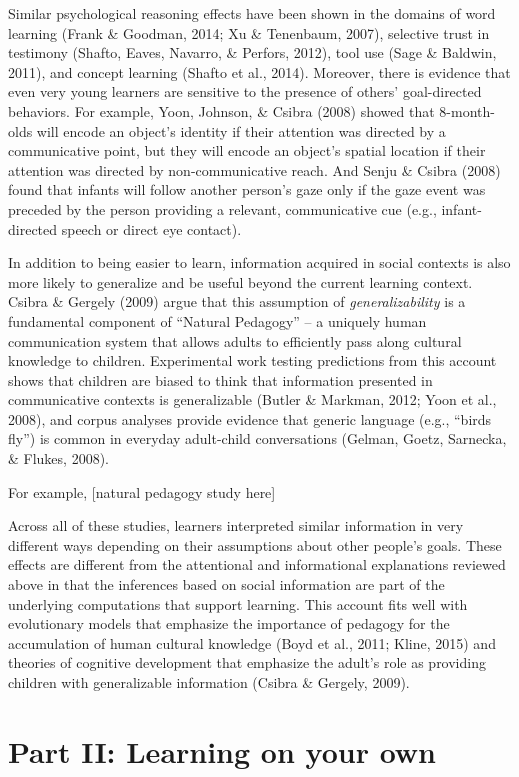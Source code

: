 \documentclass[a4paper,man,apacite,floatsintext]{apa6}
\begin{document}
Similar psychological reasoning effects have been shown in the domains
of word learning (Frank \& Goodman, 2014; Xu \& Tenenbaum, 2007),
selective trust in testimony (Shafto, Eaves, Navarro, \& Perfors, 2012),
tool use (Sage \& Baldwin, 2011), and concept learning (Shafto et al.,
2014). Moreover, there is evidence that even very young learners are
sensitive to the presence of others' goal-directed behaviors. For
example, Yoon, Johnson, \& Csibra (2008) showed that 8-month-olds will
encode an object's identity if their attention was directed by a
communicative point, but they will encode an object's spatial location
if their attention was directed by non-communicative reach. And Senju \&
Csibra (2008) found that infants will follow another person's gaze only
if the gaze event was preceded by the person providing a relevant,
communicative cue (e.g., infant-directed speech or direct eye contact).

In addition to being easier to learn, information acquired in social
contexts is also more likely to generalize and be useful beyond the
current learning context. Csibra \& Gergely (2009) argue that this
assumption of \emph{generalizability} is a fundamental component of
``Natural Pedagogy'' -- a uniquely human communication system that
allows adults to efficiently pass along cultural knowledge to children.
Experimental work testing predictions from this account shows that
children are biased to think that information presented in communicative
contexts is generalizable (Butler \& Markman, 2012; Yoon et al., 2008),
and corpus analyses provide evidence that generic language (e.g.,
``birds fly'') is common in everyday adult-child conversations (Gelman,
Goetz, Sarnecka, \& Flukes, 2008).

For example, {[}natural pedagogy study here{]}

Across all of these studies, learners interpreted similar information in
very different ways depending on their assumptions about other people's
goals. These effects are different from the attentional and
informational explanations reviewed above in that the inferences based
on social information are part of the underlying computations that
support learning. This account fits well with evolutionary models that
emphasize the importance of pedagogy for the accumulation of human
cultural knowledge (Boyd et al., 2011; Kline, 2015) and theories of
cognitive development that emphasize the adult's role as providing
children with generalizable information (Csibra \& Gergely, 2009).

\section{Part II: Learning on your
own}\label{part-ii-learning-on-your-own}
\end{document}
